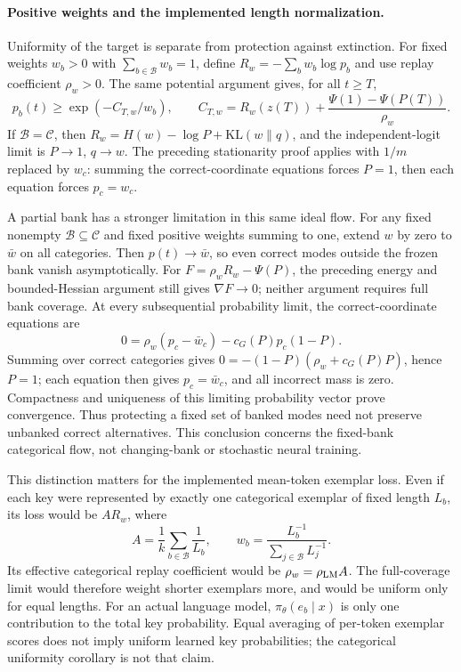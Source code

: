 \documentclass{article}
\newcommand{\1}{\mathbf 1}
\theoremstyle{remark}
\theoremstyle{definition}
\theoremstyle{plain}
\begin{document}
\paragraph{Positive weights and the implemented length normalization.}
Uniformity of the target is separate from protection against extinction.
For fixed weights $w_b>0$ with $\sum_{b\in\mathcal B}w_b=1$, define
$R_w=-\sum_b w_b\log p_b$ and use replay coefficient $\rho_w>0$.
The same potential argument gives, for all $t\ge T$,
\[
 p_b(t)\ge\exp(-C_{T,w}/w_b),\qquad
 C_{T,w}=R_w(z(T))+\frac{\Psi(1)-\Psi(P(T))}{\rho_w}.
\]
If $\mathcal B=\mathcal C$, then
$R_w=H(w)-\log P+\mathrm{KL}(w\|q)$, and the independent-logit limit is
$P\to1$, $q\to w$. The preceding stationarity proof applies with $1/m$
replaced by $w_c$: summing the correct-coordinate equations forces $P=1$,
then each equation forces $p_c=w_c$.

A partial bank has a stronger limitation in this same ideal flow. For any
fixed nonempty $\mathcal B\subseteq\mathcal C$ and fixed positive weights
summing to one, extend $w$ by zero to $\bar w$ on all categories. Then
$p(t)\to\bar w$, so even correct modes outside the frozen bank vanish
asymptotically. For $F=\rho_wR_w-\Psi(P)$, the preceding energy and
bounded-Hessian argument still gives $\nabla F\to0$; neither argument
requires full bank coverage.
At every subsequential probability limit, the correct-coordinate equations are
\[
 0=\rho_w(p_c-\bar w_c)-c_G(P)p_c(1-P).
\]
Summing over correct categories gives
$0=-(1-P)(\rho_w+c_G(P)P)$, hence $P=1$; each equation then gives
$p_c=\bar w_c$, and all incorrect mass is zero. Compactness and uniqueness
of this limiting probability vector prove convergence. Thus protecting a
fixed set of banked modes need not preserve unbanked correct alternatives.
This conclusion concerns the fixed-bank categorical flow, not changing-bank
or stochastic neural training.

This distinction matters for the implemented mean-token exemplar loss.
Even if each key were represented by exactly one categorical exemplar of
fixed length $L_b$, its loss would be $A R_w$, where
\[
 A=\frac1k\sum_{b\in\mathcal B}\frac1{L_b},\qquad
 w_b=\frac{L_b^{-1}}{\sum_{j\in\mathcal B}L_j^{-1}}.
\]
Its effective categorical replay coefficient would be $\rho_w=\rho_{\rm LM}A$.
The full-coverage limit would therefore weight shorter exemplars more, and
would be uniform only for equal lengths. For an actual language model,
$\pi_\theta(e_b\mid x)$ is only one contribution to the total key probability.
Equal averaging of per-token exemplar scores does not imply uniform learned
key probabilities; the categorical uniformity corollary is not that claim.
\end{document}
